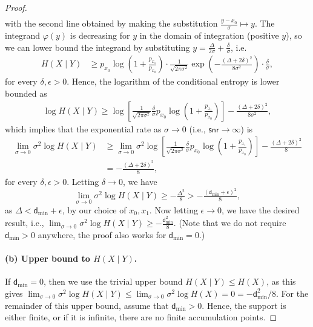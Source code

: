 \documentclass[11pt]{article}
\newcommand{\snr}{\mathsf{snr}}
\newcommand{\dmin}{\mathsf{d}_{\min}}
\begin{document}
\begin{proof}[Proof]
\begin{align*}
		\end{align*}
		with the second line obtained by making the substitution $\frac{y-x_0}{\sigma} \mapsto y$. 
		The integrand $\varphi(y)$ is decreasing for $y$ in the domain of integration (positive $y$), so we can lower bound the integrand by substituting $y = \frac{\Delta}{2\sigma} + \frac{\delta}{\sigma}$, i.e.
		\begin{align*}
			H(X \mid Y) &\geq p_{x_0}\log \left(1+\tfrac{p_{x_1}}{p_{x_0}} \right) \cdot \tfrac{1}{\sqrt{2\pi \sigma^2}} \exp\left(- \tfrac{(\Delta + 2\delta)^2}{8\sigma^2}\right) \cdot \tfrac{\delta}{\sigma},
		\end{align*}
		for every $\delta, \epsilon > 0$. Hence, the logarithm of the conditional entropy is lower bounded as
		\begin{align*}
			\log H(X \mid Y) \geq \log \left[\tfrac{1}{\sqrt{2\pi \sigma^2}}\tfrac{\delta}{\sigma} p_{x_0}\log \left(1+\tfrac{p_{x_1}}{p_{x_0}} \right) \right] - \tfrac{(\Delta + 2\delta)^2}{8\sigma^2},
		\end{align*}
		which implies that the exponential rate as $\sigma \to 0$ (i.e., $\snr \to \infty$) is 
		\begin{align*}
			\lim_{\sigma \to 0} \sigma^2 \log H(X \mid Y) &\geq \lim_{\sigma \to 0} \sigma^2\log \left[\tfrac{1}{\sqrt{2\pi \sigma^2}}\tfrac{\delta}{\sigma} p_{x_0}\log \left(1+\tfrac{p_{x_1}}{p_{x_0}} \right) \right] - \tfrac{(\Delta + 2\delta)^2}{8}\\
			&= -\tfrac{(\Delta + 2\delta)^2}{8},
		\end{align*}
		for every $\delta, \epsilon > 0$. Letting $\delta \to 0$, we have 
		$$\lim_{\sigma \to 0} \sigma^2 \log H(X \mid Y) \geq -\tfrac{\Delta^2}{8} > -\tfrac{(\dmin + \epsilon)^2}{8},$$
		as $\Delta < \dmin + \epsilon$, by our choice of $x_0, x_1$. Now letting $\epsilon \to 0$, we have the desired result, i.e., $\lim_{\sigma \to 0} \sigma^2 \log H(X \mid Y) \geq -\tfrac{\dmin^2}{8}$. (Note that we do not require $\dmin > 0$ anywhere, the proof also works for $\dmin = 0$.)
		
		
		\paragraph{(b) Upper bound to $H(X \mid Y)$. }
		\sloppy
		
		If $\dmin = 0$, then we use the trivial upper bound $H(X \mid Y) \leq H(X)$, as this gives $\lim_{\sigma \to 0}  \sigma^2\log H(X \mid Y) \leq \lim_{\sigma \to 0} \sigma^2 \log H(X) = 0 = -\dmin^2/8$. 
		For the remainder of this upper bound, assume that $\dmin > 0$. 
		Hence, the support is either finite, or if it is infinite, there are no finite accumulation points. 
		

\end{proof}
\end{document}
